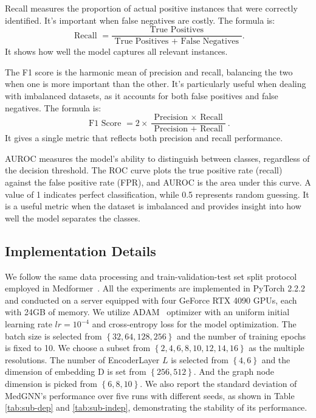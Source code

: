Recall measures the proportion of actual positive instances that were correctly identified. It’s important when false negatives are costly. The formula is:
\begin{equation}
    \text { Recall }=\frac{\text { True Positives }}{\text { True Positives }+ \text { False Negatives }}.
\end{equation}
It shows how well the model captures all relevant instances.

The F1 score is the harmonic mean of precision and recall, balancing the two when one is more important than the other. It’s particularly useful when dealing with imbalanced datasets, as it accounts for both false positives and false negatives. The formula is:
\begin{equation}
    \text { F1 Score }=2 \times \frac{\text { Precision } \times \text { Recall }}{\text { Precision }+ \text { Recall }}.
\end{equation}
It gives a single metric that reflects both precision and recall performance.

AUROC measures the model’s ability to distinguish between classes, regardless of the decision threshold. The ROC curve plots the true positive rate (recall) against the false positive rate (FPR), and AUROC is the area under this curve. A value of 1 indicates perfect classification, while 0.5 represents random guessing. It is a useful metric when the dataset is imbalanced and provides insight into how well the model separates the classes.

\subsection{Implementation Details}\label{appendix_implementation}
We follow the same data processing and train-validation-test set split protocol employed in Medformer~\cite{medformer_2024}. All the experiments are implemented in PyTorch 2.2.2~\cite{paszke2019pytorch} and conducted on a server equipped with four GeForce RTX 4090 GPUs, each with 24GB of memory. We utilize
ADAM~\cite{kingma2014adam} optimizer with an uniform initial learning rate $lr = 10^{-4}$ and cross-entropy loss for the model optimization. The batch size is selected from $\left\{32, 64, 128, 256\right\}$ and the number of training epochs is fixed to 10. We choose a subset from $\left\{2, 4, 6, 8, 10, 12, 14, 16\right\}$ as the multiple resolutions. The number of EncoderLayer $L$ is selected from $ \left\{4, 6\right\}$ and the dimension of embedding D is set from $\left\{256, 512\right\}$. And the graph node dimension is picked from $\left\{ 6, 8, 10\right\}$. We also report the standard deviation of MedGNN’s performance over five runs with different seeds, as shown in Table \ref{tab:sub-dep} and \ref{tab:sub-indep}, demonstrating the stability of its performance.
